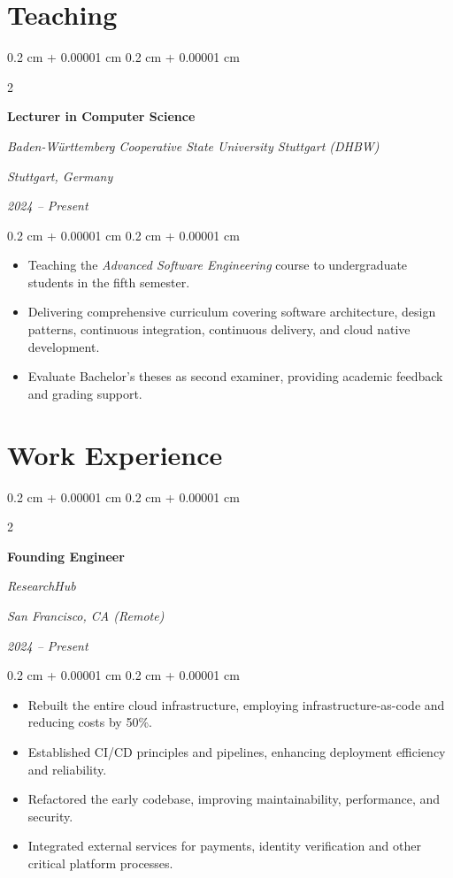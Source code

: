 \documentclass[10pt, a4paper]{article}
\newenvironment{highlights}{
    \begin{itemize}[
        topsep=0.10 cm,
        parsep=0.10 cm,
        partopsep=0pt,
        itemsep=0pt,
        leftmargin=0.4 cm + 10pt
    ]
}{
    \end{itemize}
} %
\newenvironment{onecolentry}{
    \begin{adjustwidth}{
        0.2 cm + 0.00001 cm
    }{
        0.2 cm + 0.00001 cm
    }
}{
    \end{adjustwidth}
} %
\newenvironment{twocolentry}[2][6cm]{ %
    \onecolentry
    \def\secondColumn{#2}
    \setcolumnwidth{\fill, #1} %
    \begin{paracol}{2}
}{
    \switchcolumn \raggedleft \secondColumn
    \end{paracol}
    \endonecolentry
} %
\begin{document}
\section{Teaching}
\begin{twocolentry}{
        \textit{Stuttgart, Germany}

        \textit{2024 – Present}}
    \textbf{Lecturer in Computer Science}

    \textit{Baden-Württemberg Cooperative State University Stuttgart (DHBW)}
\end{twocolentry}

\vspace{0.10 cm}
\begin{onecolentry}
    \begin{highlights}
        \item Teaching the \textit{Advanced Software Engineering} course to undergraduate students in the fifth semester.
        \item Delivering comprehensive curriculum covering software architecture, design patterns, continuous integration, continuous delivery, and cloud native development.
        \item Evaluate Bachelor's theses as second examiner, providing academic feedback and grading support.
    \end{highlights}
\end{onecolentry}




\section{Work Experience}



%
%
\begin{twocolentry}{
        \textit{San Francisco, CA (Remote)}

        \textit{2024 – Present}}
    \textbf{Founding Engineer}

    \textit{ResearchHub}
\end{twocolentry}

\vspace{0.10 cm}
\begin{onecolentry}
    \begin{highlights}
        \item Rebuilt the entire cloud infrastructure, employing infrastructure-as-code and reducing costs by 50\%.
        \item Established CI/CD principles and pipelines, enhancing deployment efficiency and reliability.
        \item Refactored the early codebase, improving maintainability, performance, and security.
        \item Integrated external services for payments, identity verification and other critical platform processes.
    \end{highlights}
\end{onecolentry}
\end{document}
